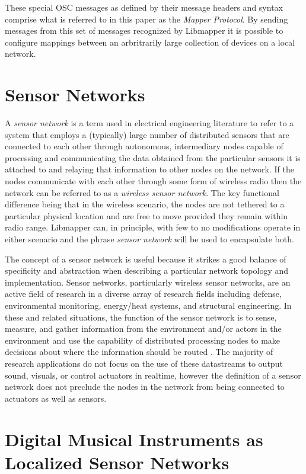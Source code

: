 These special OSC messages as defined by their message headers and syntax comprise what is referred to in this paper as the \emph{Mapper Protocol}. By sending messages from this set of messages recognized by Libmapper it is possible to configure mappings between an arbritrarily large collection of devices on a local network.

\section{Sensor Networks}

A \emph{sensor network} is a term used in electrical engineering literature to refer to a system that employs a (typically) large number of distributed sensors that are connected to each other through autonomous, intermediary nodes capable of processing and communicating the data obtained from the particular sensors it is attached to and relaying that information to other nodes on the network. If the nodes communicate with each other through some form of wireless radio then the network can be referred to as a \emph{wireless sensor network}. The key functional difference being that in the wireless scenario, the nodes are not tethered to a particular physical location and are free to move provided they remain within radio range. Libmapper can, in principle, with few to no modifications operate in either scenario and the phrase \emph{sensor network} will be used to encapsulate both.

The concept of a sensor network is useful because it strikes a good balance of specificity and abstraction when describing a particular network topology and implementation. Sensor networks, particularly wireless sensor networks, are an active field of research in a diverse array of research fields including defense, environmental monitoring, energy/heat systems, and structural engineering. In these and related situations, the function of the sensor network is to sense, measure, and gather information from the environment and/or actors in the environment and use the capability of distributed processing nodes to make decisions about where the information should be routed \cite{survey2008}. The majority of research applications do not focus on the use of these datastreams to output sound, visuals, or control actuators in realtime, however the definition of a sensor network does not preclude the nodes in the network from being connected to actuators as well as sensors.

\section{Digital Musical Instruments as Localized Sensor Networks}

